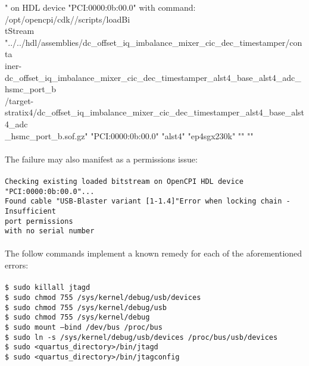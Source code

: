 \documentclass{article}
\newcommand{\terminaloutput}[1]{\texttt{#1}}
\begin{document}
{" on HDL device "PCI:0000:0b:00.0" with command: /opt/opencpi/cdk//scripts/loadBi \\
tStream "../../hdl/assemblies/dc\_offset\_iq\_imbalance\_mixer\_cic\_dec\_timestamper/conta \\iner-dc\_offset\_iq\_imbalance\_mixer\_cic\_dec\_timestamper\_alst4\_base\_alst4\_adc\_hsmc\_port\_b \\
/target-stratix4/dc\_offset\_iq\_imbalance\_mixer\_cic\_dec\_timestamper\_alst4\_base\_alst4\_adc \\
\_hsmc\_port\_b.sof.gz" "PCI:0000:0b:00.0" "alst4" "ep4sgx230k" "" "" \\
\\
}
The failure may also manifest as a permissions issue: \\ \\
\noindent\terminaloutput{Checking existing loaded bitstream on OpenCPI HDL device "PCI:0000:0b:00.0"... \\
Found cable "USB-Blaster variant [1-1.4]"Error when locking chain - Insufficient \\
 port permissions \\
 with no serial number \\
\\
}
The follow commands implement a known remedy for each of the aforementioned errors: \\ \\
\noindent\terminaloutput{\$ sudo killall jtagd \\
\$ sudo chmod 755 /sys/kernel/debug/usb/devices \\
\$ sudo chmod 755 /sys/kernel/debug/usb \\
\$ sudo chmod 755 /sys/kernel/debug \\
\$ sudo mount --bind /dev/bus /proc/bus \\
\$ sudo ln -s /sys/kernel/debug/usb/devices /proc/bus/usb/devices \\
\$ sudo <quartus\_directory>/bin/jtagd \\
\$ sudo <quartus\_directory>/bin/jtagconfig}
\end{document}
